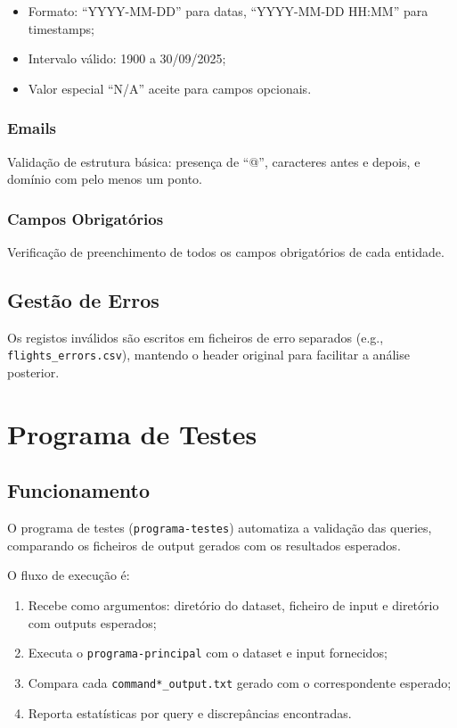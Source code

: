 \documentclass[a4paper,12pt]{scrreprt}
\begin{document}
\begin{itemize}
    \item Formato: ``YYYY-MM-DD'' para datas, ``YYYY-MM-DD HH:MM'' para timestamps;
    \item Intervalo válido: 1900 a 30/09/2025;
    \item Valor especial ``N/A'' aceite para campos opcionais.
\end{itemize}

\subsection{Emails}

Validação de estrutura básica: presença de ``@'', caracteres antes e depois, e domínio com pelo menos um ponto.

\subsection{Campos Obrigatórios}

Verificação de preenchimento de todos os campos obrigatórios de cada entidade.

\section{Gestão de Erros}

Os registos inválidos são escritos em ficheiros de erro separados (e.g., \texttt{flights\_errors.csv}), mantendo o header original para facilitar a análise posterior.

\chapter{Programa de Testes}

\section{Funcionamento}

O programa de testes (\texttt{programa-testes}) automatiza a validação das queries, comparando os ficheiros de output gerados com os resultados esperados.

O fluxo de execução é:
\begin{enumerate}
    \item Recebe como argumentos: diretório do dataset, ficheiro de input e diretório com outputs esperados;
    \item Executa o \texttt{programa-principal} com o dataset e input fornecidos;
    \item Compara cada \texttt{command*\_output.txt} gerado com o correspondente esperado;
    \item Reporta estatísticas por query e discrepâncias encontradas.
\end{enumerate}
\end{document}
